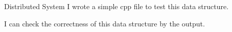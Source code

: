 \begin{homeworkProblem}{Distributed System}
        I wrote a simple cpp file to test this data structure. 
        \lstset{breaklines=true}
        
        
        I can check the correctness of this data structure by the output.
        


\end{homeworkProblem}

